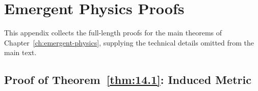 
\chapter{Emergent Physics Proofs}
\label{app:emergent-physics-proofs}

This appendix collects the full-length proofs for the main theorems
of Chapter~\ref{ch:emergent-physics}, supplying the technical details
omitted from the main text.

\section{Proof of Theorem~\ref{thm:14.1}: Induced Metric}
\label{app:pf-metric}

